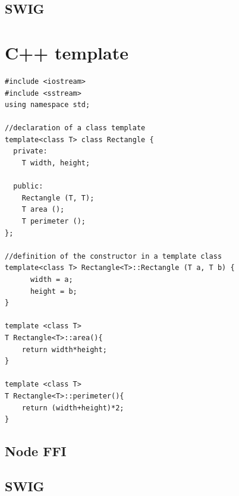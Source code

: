 \subsection{SWIG}


\section{C++ template}
\begin{lstlisting}
#include <iostream>
#include <sstream>
using namespace std;

//declaration of a class template
template<class T> class Rectangle {
  private:
    T width, height;

  public:
    Rectangle (T, T);
    T area ();
    T perimeter ();
};

//definition of the constructor in a template class
template<class T> Rectangle<T>::Rectangle (T a, T b) {
	  width = a;
	  height = b;
}

template <class T>
T Rectangle<T>::area(){
	return width*height;
}

template <class T>
T Rectangle<T>::perimeter(){
	return (width+height)*2;
}
\end{lstlisting}

\subsection{Node FFI}
    
    
\subsection{SWIG}
